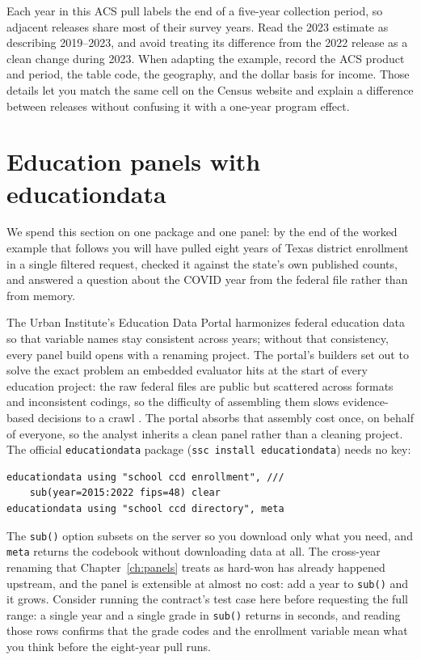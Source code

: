 Each year in this ACS pull labels the end of a five-year collection period, so adjacent releases share most of their survey years. Read the 2023 estimate as describing 2019--2023, and avoid treating its difference from the 2022 release as a clean change during 2023. When adapting the example, record the ACS product and period, the table code, the geography, and the dollar basis for income. Those details let you match the same cell on the Census website and explain a difference between releases without confusing it with a one-year program effect.

\section{Education panels with educationdata}
We spend this section on one package and one panel: by the end of the worked example that follows you will have pulled eight years of Texas district enrollment in a single filtered request, checked it against the state's own published counts, and answered a question about the COVID year from the federal file rather than from memory.

The Urban Institute's Education Data Portal harmonizes federal education data so that variable names stay consistent across years; without that consistency, every panel build opens with a renaming project. The portal's builders set out to solve the exact problem an embedded evaluator hits at the start of every education project: the raw federal files are public but scattered across formats and inconsistent codings, so the difficulty of assembling them slows evidence-based decisions to a crawl \parencite{chingos2018portal}. The portal absorbs that assembly cost once, on behalf of everyone, so the analyst inherits a clean panel rather than a cleaning project. The official \texttt{educationdata} package (\texttt{ssc install educationdata}) needs no key:
\par
{\footnotesize
\begin{verbatim}
educationdata using "school ccd enrollment", ///
    sub(year=2015:2022 fips=48) clear
educationdata using "school ccd directory", meta
\end{verbatim}
}
The \texttt{sub()} option subsets on the server so you download only what you need, and \texttt{meta} returns the codebook without downloading data at all. The cross-year renaming that Chapter~\ref{ch:panels} treats as hard-won has already happened upstream, and the panel is extensible at almost no cost: add a year to \texttt{sub()} and it grows. Consider running the contract's test case here before requesting the full range: a single year and a single grade in \texttt{sub()} returns in seconds, and reading those rows confirms that the grade codes and the enrollment variable mean what you think before the eight-year pull runs.

